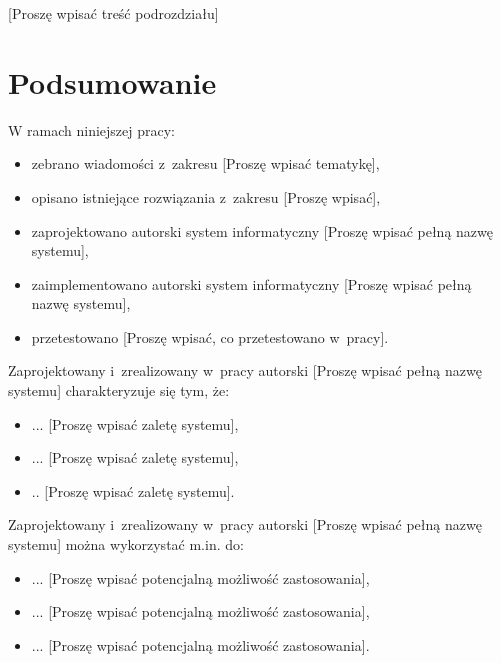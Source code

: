 \documentclass{PracaDyplomowa}
\begin{document}
[Proszę wpisać treść podrozdziału]

\cleardoublepage
\chapter{Podsumowanie}


W ramach niniejszej pracy:

\begin{itemize}
\item zebrano wiadomości z~zakresu [Proszę wpisać tematykę],
\item opisano istniejące rozwiązania z~zakresu [Proszę wpisać],
\item zaprojektowano autorski system informatyczny [Proszę wpisać pełną nazwę systemu],
\item zaimplementowano autorski system informatyczny [Proszę wpisać pełną nazwę systemu],
\item przetestowano [Proszę wpisać, co przetestowano w~pracy].
\end{itemize}

Zaprojektowany i~zrealizowany w~pracy autorski [Proszę wpisać pełną nazwę systemu] charakteryzuje się tym, że:

\begin{itemize}
\item ... [Proszę wpisać zaletę systemu],
\item ... [Proszę wpisać zaletę systemu],
\item .. [Proszę wpisać zaletę systemu].
\end{itemize}

Zaprojektowany i~zrealizowany w~pracy autorski [Proszę wpisać pełną nazwę systemu] można wykorzystać m.in. do:

\begin{itemize}
\item ... [Proszę wpisać potencjalną możliwość zastosowania],
\item ... [Proszę wpisać potencjalną możliwość zastosowania],
\item ... [Proszę wpisać potencjalną możliwość zastosowania].
\end{itemize}
\end{document}

